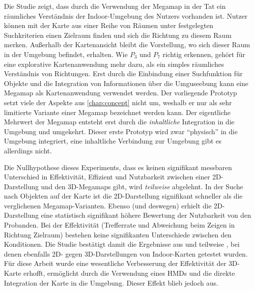 Die Studie zeigt, dass durch die Verwendung der Megamap in der Tat ein räumliches Verständnis der Indoor-Umgebung des Nutzers vorhanden ist.
Nutzer können mit der Karte aus einer Reihe von Räumen unter festgelegten Suchkriterien einen Zielraum finden und sich die Richtung zu diesem Raum merken.
Außerhalb der Kartenansicht bleibt die Vorstellung, wo sich dieser Raum in der Umgebung befindet, erhalten.
Wie $P_3$ und $P_7$ richtig erkennen, gehört für eine explorative Kartenanwendung mehr dazu, als ein simples räumliches Verständnis von Richtungen.
Erst durch die Einbindung einer Suchfunktion für Objekte und die Integration von Informationen über die Umguseebung kann eine Megamap als Kartenanwendung verwendet werden.
Der vorliegende Prototyp setzt viele der Aspekte aus \autoref{chap:concept} nicht um, weshalb er nur als sehr limitierte Variante einer Megamap bezeichnet werden kann.
Der eigentliche Mehrwert der Megamap entsteht erst durch die \emph{inhaltliche} Integration in die Umgebung und umgekehrt.
Dieser erste Prototyp wird zwar \enquote{physisch} in die Umgebung integriert, eine inhaltliche Verbindung zur Umgebung gibt es allerdings nicht.

Die Nullhypothese dieses Experiments, dass es keinen signifikant messbaren Unterschied in Effektivität, Effizient und Nutzbarkeit zwischen einer 2D-Darstellung und den 3D-Megamaps gibt, wird \emph{teilweise} abgelehnt.
In der Suche nach Objekten auf der Karte ist die 2D-Darstellung signifikant schneller als die verglichenen Megamap-Varianten.
Ebenso (und deswegen) erhielt die 2D-Darstellung eine statistisch signifikant höhere Bewertung der Nutzbarkeit von den Probanden.
Bei der Effektivität (Trefferrate und Abweichung beim Zeigen in Richtung Zielraum) bestehen keine signifikanten Unterschiede zwischen den Konditionen.
Die Studie bestätigt damit die Ergebnisse aus \autocite{Chittaro2006} und teilweise \autocite{Li2013}, bei denen ebenfalls 2D- gegen 3D-Darstellungen von Indoor-Karten getestet wurden.
Für diese Arbeit wurde eine wesentliche Verbesserung der Effektivität der 3D-Karte erhofft, ermöglicht durch die Verwendung eines HMDs und die direkte Integration der Karte in die Umgebung.
Dieser Effekt blieb jedoch aus.

%
\cleardoublepage
